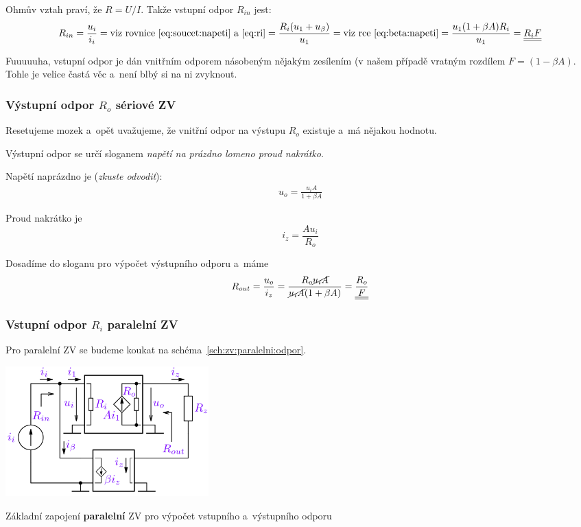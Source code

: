 \documentclass[a4paper,12pt]{article}   %
\begin{document}
Ohmův vztah praví, že $R=U/I$. Takže vstupní odpor $R_{in}$ jest:
\begin{equation}
    R_{in} = \frac{u_i}{i_i} = \text{viz rovnice \eqref{eq:soucet:napeti} a~\eqref{eq:ri}} = \frac{R_i(u_\text{1}+u_\beta)}{u_1} = \text{viz rce \eqref{eq:beta:napeti}} = \frac{u_\text{1}(1+\beta A)R_i}{u_\text{1}} = \underline{\underline{R_i F}}
\end{equation}

Fuuuuuha, vstupní odpor je dán vnitřním odporem násobeným nějakým zesílením (v našem případě vratným rozdílem $F=(1-\beta A)$. Tohle je velice častá věc a~není blbý si na ni zvyknout.


\subsubsection*{Výstupní odpor $R_o$ sériové ZV}

Resetujeme mozek a~opět uvažujeme, že vnitřní odpor na výstupu $R_o$ existuje a~má nějakou hodnotu.

Výstupní odpor se určí sloganem \textit{napětí na prázdno lomeno proud nakrátko}. 

Napětí naprázdno je (\textit{zkuste odvodit}):
\begin{align*}
    u_o = \frac{u_i A}{1+\beta A}
\end{align*}

Proud nakrátko je
\begin{equation*}
    i_z = \frac{A u_i}{R_o}
\end{equation*}

Dosadíme do sloganu pro výpočet výstupního odporu a~máme
\begin{equation}
    R_{out} = \frac{u_o}{i_z} = \frac{R_o \cancel{u_i A}}{\cancel{u_i A}(1+\beta A)} = \underline{\underline{\frac{R_o}{F}}}
\end{equation}

\subsubsection*{Vstupní odpor $R_i$ paralelní ZV}
Pro paralelní ZV se budeme koukat na schéma~\ref{sch:zv:paralelni:odpor}.
\begin{schema}[h!]
    \centering
    \includegraphics[height=5cm]{ZV_paralelni-odpory.PNG}
    \caption{Základní zapojení \textbf{paralelní} ZV pro výpočet vstupního a~výstupního odporu}
    \label{sch:zv:paralelni:odpor}
\end{schema}
\end{document}
